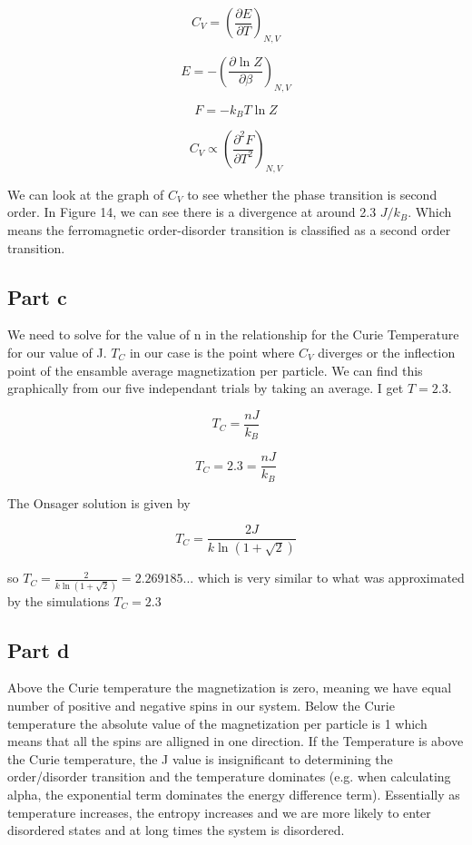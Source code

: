 \documentclass{article}
\begin{document}
		\[C_V = (\frac{\partial E}{\partial T})_{N,V}\]

		\[E = -(\frac{\partial \ln Z}{\partial \beta})_{N,V}\]

		\[F = -k_BT \ln Z\]

		\[C_V \propto (\frac{\partial ^2 F}{\partial T^2})_{N,V}\]

	We can look at the graph of $C_V$ to see whether the phase transition is second order. In Figure 14, we can see there is a divergence at around 2.3 $J/k_B$. Which means the ferromagnetic order-disorder transition is classified as a second order transition.


\subsection*{Part c}

	We need to solve for the value of n in the relationship for the Curie Temperature for our value of J. $T_C$ in our case is the point where $C_V$ diverges or the inflection point of the ensamble average magnetization per particle. We can find this graphically from our five independant trials by taking an average. I get $T = 2.3$.

	\[ T_C = \frac{nJ}{k_B}\]

	\[T_C = 2.3 = \frac{nJ}{k_B}\] 

	The Onsager solution is given by 

	\[T_C = \frac{2J}{k \ln (1 + \sqrt{2})}\]

	so $T_C = \frac{2}{k \ln (1 + \sqrt{2})} = 2.269185...$ which is very similar to what was approximated by the simulations $T_C = 2.3$


\subsection*{Part d}
	Above the Curie temperature the magnetization is zero, meaning we have equal number of positive and negative spins in our system. Below the Curie temperature the absolute value of the magnetization per particle is 1 which means that all the spins are alligned in one direction. If the Temperature is above the Curie temperature, the J value is insignificant to determining the order/disorder transition and the temperature dominates (e.g. when calculating alpha, the exponential term dominates the energy difference term). Essentially as temperature increases, the entropy increases and we are more likely to enter disordered states and at long times the system is disordered. 
\end{document}
